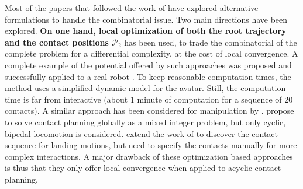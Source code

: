 Most of the papers that followed the work of \citeauthor{conf/iser/BretlRLKA04} have explored alternative formulations to handle the combinatorial issue. Two main directions have been explored. \textbf{On one hand, local optimization of both the root trajectory \Pa and the contact positions $\mathcal{P}_2$} has been used, to trade the combinatorial of the complete problem for a differential complexity, at the cost of local convergence. A complete example of the potential offered by such approaches was proposed \citep{Mordatch:2012:DCB:2185520.2185539} and successfully applied to a real robot \citep{mordatch2015}. To keep reasonable computation times, the method uses a simplified dynamic model for the avatar. Still, the computation time is far from interactive  (about 1 minute of computation for a sequence of 20 contacts).  A similar approach has been considered for manipulation by \cite{gabicciniisrr15}. \citeauthor{DBLP:conf/humanoids/DeitsT14} propose to solve contact planning globally as a mixed integer problem, but only cyclic, bipedal locomotion is considered. 
\citeauthor{dai2014whole} extend the work of \citeauthor{Posa:2014:DMT:2568343.2568352} to discover the contact sequence for landing motions, but need to specify
the contacts manually for more complex interactions.
A major drawback of these optimization based approaches is thus that they only offer local convergence when applied to acyclic contact planning.


